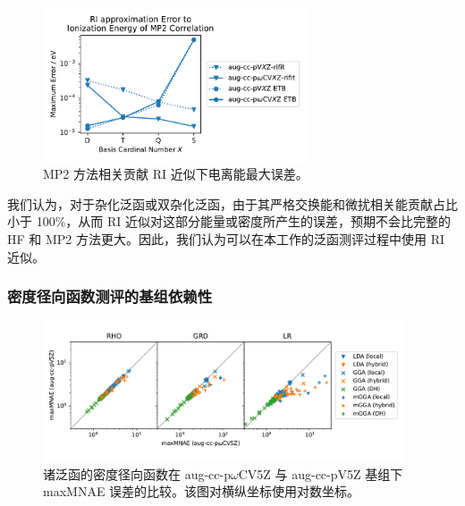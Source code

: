 \begin{figure}[t]
    \centering
    \caption{MP2 方法相关贡献 RI 近似下电离能最大误差。}
    \label{fig.MP2-RI-eng}
    \includegraphics[width=0.7\textwidth]{assets/MP2-RI-eng.pdf}
\end{figure}

我们认为，对于杂化泛函或双杂化泛函，由于其严格交换能和微扰相关能贡献占比小于 100\%，从而 RI 近似对这部分能量或密度所产生的误差，预期不会比完整的 HF 和 MP2 方法更大。因此，我们认为可以在本工作的泛函测评过程中使用 RI 近似。

\subsubsection{密度径向函数测评的基组依赖性}

\begin{figure}[t]
    \centering
    \caption{诸泛函的密度径向函数在 aug-cc-p$\omega$CV5Z 与 aug-cc-pV5Z 基组下 maxMNAE 误差的比较。该图对横纵坐标使用对数坐标。}
    \label{fig.basisdep-RDF}
    \includegraphics[width=0.95\textwidth]{assets/basisdep-RDF.pdf}
\end{figure}

